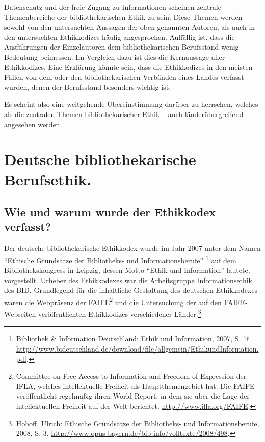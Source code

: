 \documentclass[output=paper]{langscibook}
\begin{document}
Datenschutz und der freie Zugang zu Informationen scheinen zentrale
Themenbereiche der bibliothekarischen Ethik zu sein. Diese Themen werden
sowohl von den untersuchten Aussagen der oben genannten Autoren, als
auch in den untersuchten Ethikkodizes häufig angesprochen. Auffällig
ist, dass die Ausführungen der Einzelautoren dem bibliothekarischen
Berufsstand wenig Bedeutung beimessen. Im Vergleich dazu ist dies die
Kernaussage aller Ethikkodizes. Eine Erklärung könnte sein, dass die
Ethikkodizes in den meisten Fällen von dem oder den bibliothekarischen
Verbänden eines Landes verfasst wurden, denen der Berufsstand besonders
wichtig ist.

Es scheint also eine weitgehende Übereinstimmung darüber zu herrschen,
welches als die zentralen Themen bibliothekarischer Ethik -- auch
länderübergreifend- angesehen werden.

\hypertarget{deutsche-bibliothekarische-berufsethik.}{%
\section*{Deutsche bibliothekarische
Berufsethik.}\label{deutsche-bibliothekarische-berufsethik.}}

\hypertarget{wie-und-warum-wurde-der-ethikkodex-verfasst}{%
\subsection*{Wie und warum wurde der Ethikkodex
verfasst?}\label{wie-und-warum-wurde-der-ethikkodex-verfasst}}

Der deutsche bibliothekarische Ethikkodex wurde im Jahr 2007 unter dem
Namen \enquote{Ethische Grundsätze der Bibliotheks- und
Informationsberufe} \footnote{Bibliothek \& Information Deutschland:
  Ethik und Information, 2007, S. 1f.
  \url{http://www.bideutschland.de/download/file/allgemein/EthikundInformation.pdf}.}
auf dem Bibliothekskongress in Leipzig, dessen Motto \enquote{Ethik und
Information} lautete, vorgestellt. Urheber des Ethikkodexes war die
Arbeitsgruppe Informationsethik des BID. Grundlegend für die inhaltliche
Gestaltung des deutschen Ethikkodexes waren die Webpräsenz der
FAIFE\footnote{Committee on Free Access to Information and Freedom of
  Expression der IFLA, welches intellektuelle Freiheit als
  Hauptthemengebiet hat. Die FAIFE veröffentlicht regelmäßig ihren World
  Report, in dem sie über die Lage der intellektuellen Freiheit auf der
  Welt berichtet. \url{http://www.ifla.org/FAIFE}.} und die Untersuchung
der auf den FAIFE-Webseiten veröffentlichten Ethikkodizes verschiedener
Länder.\footnote{Hohoff, Ulrich: Ethische Grundsätze der Bibliotheks- und Informationsberufe, 2008, S. 3.
  \url{http://www.opus-bayern.de/bib-info/volltexte/2008/498}.}
\end{document}
